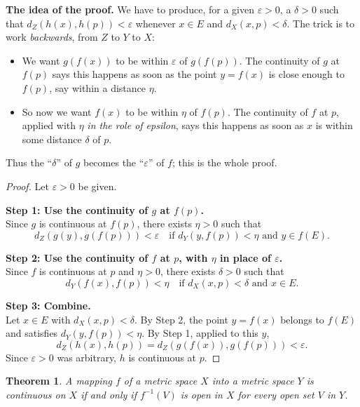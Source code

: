\documentclass{article}
\theoremstyle{mythm}
\newtheorem{theorem}{Theorem}[section]
\begin{document}
\textbf{The idea of the proof.} We have to produce, for a given $\varepsilon > 0$, a $\delta > 0$ such that $d_Z(h(x), h(p)) < \varepsilon$ whenever $x \in E$ and $d_X(x,p) < \delta$. The trick is to work \textit{backwards}, from $Z$ to $Y$ to $X$:
\begin{itemize}
    \item We want $g(f(x))$ to be within $\varepsilon$ of $g(f(p))$. The continuity of $g$ at $f(p)$ says this happens as soon as the point $y = f(x)$ is close enough to $f(p)$, say within a distance $\eta$.
    \item So now we want $f(x)$ to be within $\eta$ of $f(p)$. The continuity of $f$ at $p$, applied with $\eta$ \textit{in the role of epsilon}, says this happens as soon as $x$ is within some distance $\delta$ of $p$.
\end{itemize}
Thus the ``$\delta$'' of $g$ becomes the ``$\varepsilon$'' of $f$; this is the whole proof.

\begin{proof}
Let $\varepsilon > 0$ be given.

\textbf{Step 1: Use the continuity of $g$ at $f(p)$.}\\
Since $g$ is continuous at $f(p)$, there exists $\eta > 0$ such that
\[
d_Z(g(y), g(f(p))) < \varepsilon \quad \text{if } d_Y(y, f(p)) < \eta \text{ and } y \in f(E).
\]

\textbf{Step 2: Use the continuity of $f$ at $p$, with $\eta$ in place of $\varepsilon$.}\\
Since $f$ is continuous at $p$ and $\eta > 0$, there exists $\delta > 0$ such that
\[
d_Y(f(x), f(p)) < \eta \quad \text{if } d_X(x,p) < \delta \text{ and } x \in E.
\]

\textbf{Step 3: Combine.}\\
Let $x \in E$ with $d_X(x,p) < \delta$. By Step 2, the point $y = f(x)$ belongs to $f(E)$ and satisfies $d_Y(y, f(p)) < \eta$. By Step 1, applied to this $y$,
\[
d_Z(h(x), h(p)) = d_Z(g(f(x)), g(f(p))) < \varepsilon.
\]
Since $\varepsilon > 0$ was arbitrary, $h$ is continuous at $p$.
\end{proof}

\begin{theorem}\label{thm:openpre}
A mapping $f$ of a metric space $X$ into a metric space $Y$ is continuous on $X$ if and only if $f^{-1}(V)$ is open in $X$ for every open set $V$ in $Y$.
\end{theorem}
\end{document}
